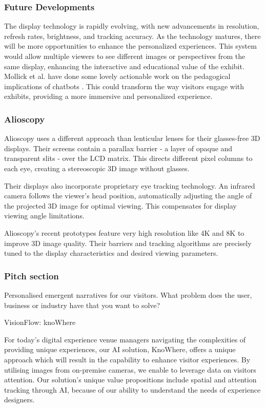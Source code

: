 \subsubsection{Future Developments}
The display technology is rapidly evolving, with new advancements in resolution, refresh rates, brightness, and tracking accuracy. As the technology matures, there will be more opportunities to enhance the personalized experiences.
This system would allow multiple viewers to see different images or perspectives from the same display, enhancing the interactive and educational value of the exhibit. Mollick et al. have done some lovely actionable work on the pedagogical implications of chatbots \cite{mollick2022new, mollick2023assigning, mollick2023using}. This could transform the way visitors engage with exhibits, providing a more immersive and personalized experience.



\subsubsection{Alioscopy}

Alioscopy uses a different approach than lenticular lenses for their glasses-free 3D displays. Their screens contain a parallax barrier - a layer of opaque and transparent slits - over the LCD matrix. This directs different pixel columns to each eye, creating a stereoscopic 3D image without glasses.

Their displays also incorporate proprietary eye tracking technology. An infrared camera follows the viewer's head position, automatically adjusting the angle of the projected 3D image for optimal viewing. This compensates for display viewing angle limitations.

Alioscopy's recent prototypes feature very high resolution like 4K and 8K to improve 3D image quality. Their barriers and tracking algorithms are precisely tuned to the display characteristics and desired viewing parameters.

\subsubsection{Pitch section}
Personalised emergent narratives for our visitors.
What problem does the user, business or industry have that you want to solve?

VisionFlow: knoWhere

For today's digital experience venue managers navigating the complexities of providing unique experiences, our AI solution, KnoWhere, offers a unique approach which will result in the capability to enhance visitor experiences. By utilising images from on-premise cameras, we enable to leverage data on visitors attention. Our solution's unique value propositions include spatial and attention tracking through AI, because of our ability to understand the needs of experience designers. 


